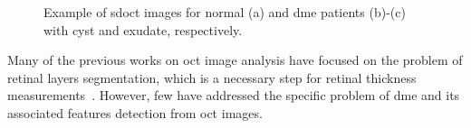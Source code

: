 \begin{figure}
\begin{center}
\hspace*{\fill}
\end{center}
\caption{ Example of \ac{sdoct} images for normal (a) and \ac{dme} patients (b)-(c) with cyst and exudate, respectively.}
\label{fig:dme-normal}
\end{figure}
Many of the previous works on \ac{oct} image analysis have focused on the problem of retinal layers segmentation, which is a necessary step for retinal thickness measurements~\cite{Chiu2010,Kafieh2013}.
However, few have addressed the specific problem of \ac{dme} and its associated features detection from \ac{oct} images.

